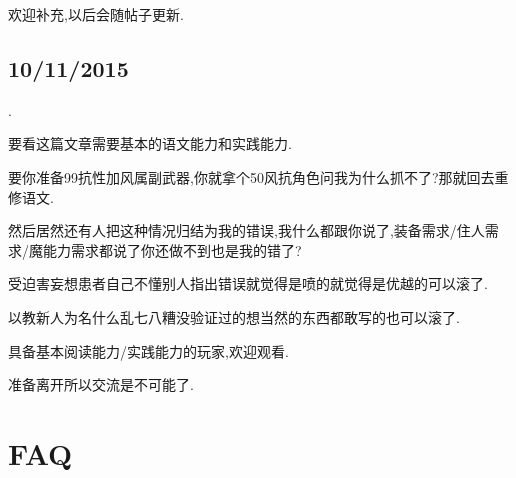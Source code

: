 欢迎补充,以后会随帖子更新.

\newpage

\subsection{10/11/2015}

{\color{red}{私货,攻击性较强,一般人请翻页}}

{\color{red}{看不惯我的可以滚了,这篇文章是分对象的}.

要看这篇文章需要基本的语文能力和实践能力.

要你准备99抗性加风属副武器,你就拿个50风抗角色问我为什么抓不了?那就回去重修语文.

然后居然还有人把这种情况归结为我的错误,我什么都跟你说了,装备需求/住人需求/魔能力需求都说了你还做不到也是我的错了?

受迫害妄想患者自己不懂别人指出错误就觉得是喷的就觉得是优越的可以滚了.

以教新人为名什么乱七八糟没验证过的想当然的东西都敢写的也可以滚了.}

具备基本阅读能力/实践能力的玩家,欢迎观看.

准备离开所以交流是不可能了.

\newpage

\tableofcontents

\newpage

\section{FAQ}

